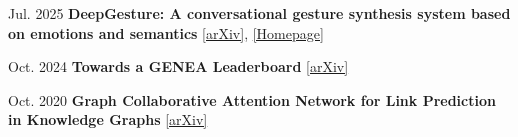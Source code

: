 \begin{samepage}
	
\begin{twocolentry}{Jul. 2025}
	\textbf{DeepGesture: A conversational gesture synthesis system based on
		emotions and semantics} \href{https://arxiv.org/abs/2507.03147v1}{[arXiv]}, \href{https://deepgesture.github.io}{[Homepage]}
	
	\vspace{0.10 cm}
\end{twocolentry}


\begin{twocolentry}{Oct. 2024}
	\textbf{Towards a GENEA Leaderboard} \href{https://arxiv.org/abs/2410.06327}{[arXiv]}
	
	\vspace{0.10 cm}
	
\end{twocolentry}


\begin{twocolentry}{Oct. 2020}
	\textbf{Graph Collaborative Attention Network for Link Prediction in Knowledge Graphs} \href{https://arxiv.org/abs/2507.03947}{[arXiv]}
	\vspace{0.10 cm}
	
\end{twocolentry}
\end{samepage}